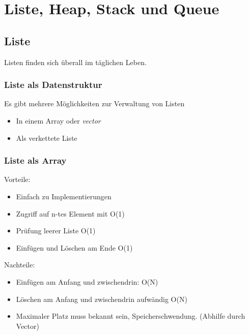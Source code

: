 \documentclass{book}
\begin{document}
\chapter{Liste, Heap, Stack und Queue}
\section{Liste}
Listen finden sich überall im täglichen Leben.
\subsection{Liste als Datenstruktur}
Es gibt mehrere Möglichkeiten zur Verwaltung von Listen
\begin{itemize}
	\item In einem Array oder \textit{vector}
	\item Als verkettete Liste
\end{itemize}

\subsection{Liste als Array} 
Vorteile:
\begin{itemize}
	\item Einfach zu Implementierungen
	\item Zugriff auf n-tes Element mit O(1)
	\item Prüfung leerer Liste O(1)
	\item Einfügen und Löschen am Ende O(1)
\end{itemize}
Nachteile: 
\begin{itemize}
	\item Einfügen am Anfang und zwischendrin: O(N)
	\item Löschen am Anfang und zwischendrin aufwändig O(N)
	\item Maximaler Platz muss bekannt sein, Speicherschwendung. (Abhilfe durch Vector)
\end{itemize}
\end{document}
